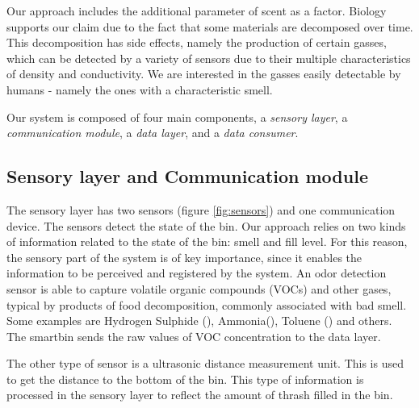 Our approach includes the additional parameter of scent as a factor.
Biology supports our claim due to the fact that some materials are decomposed over time.
This decomposition has side effects, namely the production of certain gasses,
which can be detected by a variety of sensors due to their multiple characteristics of density and conductivity.
We are interested in the gasses easily detectable by humans - namely the ones with a characteristic smell.

Our system is composed of four main components, a \textit{sensory layer}, a \textit{communication module},  a \textit{	data layer}, and a \textit{data consumer}. 

\subsection{Sensory layer and Communication module}
The sensory layer has two sensors (figure \ref{fig:sensors}) and one communication device. The sensors detect the state of the bin.
Our approach relies on two kinds of information related to the state of the bin: smell and fill level.
For this reason, the sensory part of the system is of key importance, since it enables the information to be perceived and registered by the system.
An odor detection sensor is able to capture volatile organic compounds (VOCs) and other gases, typical by products of food decomposition, commonly associated with bad smell. 
Some examples are Hydrogen Sulphide (), Ammonia(), Toluene () and others.
The smartbin sends the raw values of VOC concentration to the data layer.

The other type of sensor is a ultrasonic distance measurement unit. This is used to get the distance to the bottom of the bin.
This type of information is processed in the sensory layer to reflect the amount of thrash filled in the bin.

